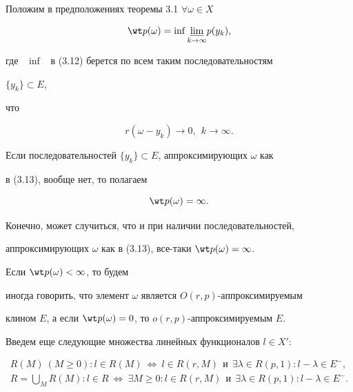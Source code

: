  


Положим в предположениях теоремы 3.1\; $\forall\omega\in X$ 


\begin{equation} 


\wt p(\omega)=\inf\underset{k\to\infty}{\varliminf}{}p(y_k), 


\end{equation} 


где \ $\inf$ \ в (3.12) берется по всем таким последовательностям 


$\{y_k\}\subset E$, 


что 


\begin{equation} 


r(\omega-y_k)\to0,\ \ k\to\infty. 


\end{equation} 


Если последовательностей $\{y_k\}\subset E$, аппроксимирующих $\omega$ как 


в (3.13), вообще нет, то полагаем 


\begin{equation} 


\wt p(\omega)=\infty. 


\end{equation} 


Конечно, может случиться, что и при наличии последовательностей, 


аппроксимирующих $\omega$ как в (3.13), все-таки $\wt p(\omega)=\infty$. 


Если $\wt p(\omega)<\infty$, то будем 


иногда говорить, что элемент $\omega$ является $O(r,p)$-аппроксимируемым 


клином $E$, а если $\wt p(\omega)=0$, то $o(r,p)$-аппроксимируемым $E$. 


 


Введем еще следующие множества линейных функционалов $l\in X'$: 


\begin{gather} 


R(M)\ (M\ge 0):l\in R(M)\ \Longleftrightarrow \ 


l\in R(r,M)\ \ \text{и}\ \ \exists\lambda\in R(p,1): 


l-\lambda\in E^-,\\ 


% 


R=\bigcup_M R(M):l\in R\ \Longleftrightarrow \ 


\exists M\ge0:l\in R(r,M)\ \ \text{и} \ \ 


\exists\lambda\in R(p,1):l-\lambda\in E^-. 


\end{gather} 



